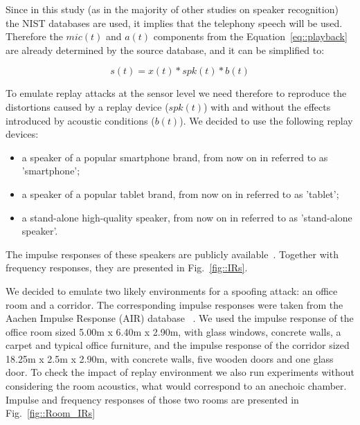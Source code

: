 



Since in this study (as in the majority of other studies on speaker recognition) the NIST databases are used, it implies that the telephony speech will be used. Therefore the $mic(t)$ and $a(t)$ components from the Equation~\ref{eq::playback} are already determined by the source database, and it can be simplified to:

\begin{equation}
s(t) = x(t)* spk(t) * b(t)
\label{eq:playback_simple}
\end{equation}

To emulate replay attacks at the sensor level we need therefore to reproduce the distortions caused by a replay device ($spk(t)$) with and without the effects introduced by acoustic conditions ($b(t)$). We decided to use the following replay devices:

\begin{itemize}
\item a speaker of a popular smartphone brand, from now on in referred to as 'smartphone';
\item a speaker of a popular tablet brand, from now on in referred to as 'tablet';
\item a stand-alone high-quality speaker, from now on in referred to as 'stand-alone speaker'.
\end{itemize}

The impulse responses of these speakers are publicly available~\cite{Brown2014}. Together with frequency responses, they are presented in Fig.~\ref{fig::IRs}.



We decided to emulate two likely environments for a spoofing attack: an office room and a corridor. The corresponding impulse responses were taken from the Aachen Impulse Response (AIR) database ~\cite{Jeub2009}. We used the impulse response of the office room sized 5.00m x 6.40m x 2.90m, with glass windows, concrete walls, a carpet and typical office furniture, and the impulse response of the corridor sized 18.25m x 2.5m x 2.90m, with concrete walls, five wooden doors and one glass door. To check the impact of replay environment we also run experiments without considering the room acoustics, what would correspond to an anechoic chamber. Impulse and frequency responses of those two rooms are presented in Fig.~\ref{fig::Room_IRs}

